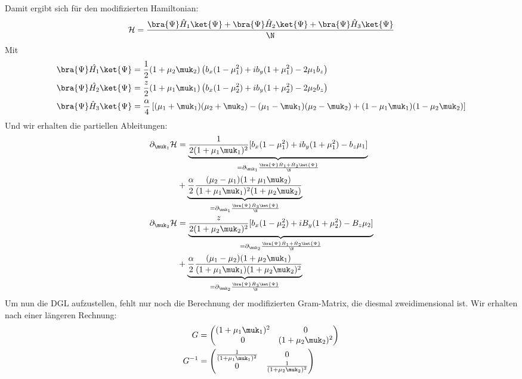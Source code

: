 Damit ergibt sich für den modifizierten Hamiltonian: 
\begin{align}
    \mathcal{H} &= \frac{\bra{\Psi}\hat{H}_1\ket{\Psi}+ \bra{\Psi}\hat{H}_2\ket{\Psi} +\bra{\Psi}\hat{H}_3\ket{\Psi}}{\N}\\
\end{align}
Mit
\begin{align}
   \bra{\Psi}\hat{H_1}\ket{\Psi} &= \frac{1}{2}(1+\mu_2\muk_2)\left(b_x(1-\mu_1^2) + ib_y(1+\mu_1^2) - 2\mu_1 b_z\right)\\
   \bra{\Psi}\hat{H_2}\ket{\Psi} &= \frac{z}{2}(1+\mu_1\muk_1)\left(b_x(1-\mu_2^2) + ib_y(1+\mu_2^2) - 2\mu_2 b_z\right)\\
   \bra{\Psi}\hat{H}_3\ket{\Psi} &= \frac{\alpha}{4}\left[( \mu_1 + \muk_1)( \mu_2 + \muk_2) - (\mu_1-\muk_1)(\mu_2 - \muk_2) + (1-\mu_1\muk_1)(1-\mu_2\muk_2)\right]
\end{align}  
Und wir erhalten die partiellen Ableitungen:
\begin{align}
    \partial_{\muk_1}\mathcal{H} &= \underbrace{\frac{1}{2(1+\mu_1\muk_1)^2}[b_x(1-\mu_1^2) + ib_y(1+\mu_1^2) - b_z\mu_1]}_{= \partial_{\muk_1} \frac{\bra{\Psi}\hat{H}_1 + \hat{H}_2\ket{\Psi}}{\N}} \nonumber\\
    &+ \underbrace{\frac{\alpha}{2}\frac{(\mu_2 -\mu_1)(1+\mu_1\muk_2)}{(1+\mu_1\muk_1)^2(1+\mu_2\muk_2)}}_{= \partial_{\muk_1} \frac{\bra{\Psi}\hat{H}_3\ket{\Psi}}{\N}}\\
    \partial_{\muk_2}\mathcal{H} &= \underbrace{\frac{z}{2(1+\mu_2\muk_2)^2}[b_x(1-\mu_2^2) + iB_y(1+\mu_2^2) - B_z\mu_2]}_{= \partial_{\muk_2} \frac{\bra{\Psi}\hat{H}_1 + \hat{H}_2\ket{\Psi}}{\N}} \nonumber \\
    &+ \underbrace{\frac{\alpha}{2}\frac{(\mu_1 -\mu_2)(1+\mu_2\muk_1)}{(1+\mu_1\muk_1)(1+\mu_2\muk_2)^2}}_{= \partial_{\muk_2} \frac{\bra{\Psi}\hat{H}_3\ket{\Psi}}{\N}}
\end{align}
Um nun die DGL aufzustellen, fehlt nur noch die Berechnung der modifizierten Gram-Matrix, die diesmal zweidimensional ist. 
Wir erhalten nach einer längeren Rechnung:
\begin{align}
    G &=
    \begin{pmatrix}
        (1+\mu_1\muk_1)^2 & 0 \\
        0 &(1+\mu_2\muk_2)^2
    \end{pmatrix} \\
    G^{-1} &=
    \begin{pmatrix}
        \frac{1}{(1+\mu_1\muk_1)^2} & 0 \\
        0 &\frac{1}{(1+\mu_2\muk_2)^2}
    \end{pmatrix}
\end{align}
